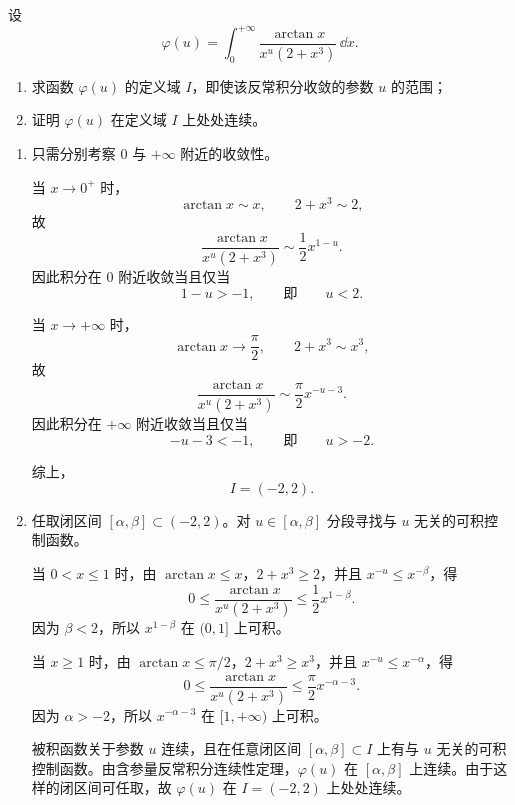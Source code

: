 \begin{question}[15分]
设
\[
  \varphi(u)=\int_0^{+\infty}\frac{\arctan x}{x^u(2+x^3)}\,\dd{x}.
\]
\begin{enumerate}
  \item 求函数 $\varphi(u)$ 的定义域 $I$，即使该反常积分收敛的参数 $u$ 的范围；
  \item 证明 $\varphi(u)$ 在定义域 $I$ 上处处连续。
\end{enumerate}
\begin{solution}
\begin{enumerate}
  \item 只需分别考察 $0$ 与 $+\infty$ 附近的收敛性。

  当 $x\to0^+$ 时，
  \[
    \arctan x\sim x,\qquad 2+x^3\sim2,
  \]
  故
  \[
    \frac{\arctan x}{x^u(2+x^3)}
    \sim \frac12 x^{1-u}.
  \]
  因此积分在 $0$ 附近收敛当且仅当
  \[
    1-u>-1,
    \qquad\text{即}\qquad u<2.
  \]

  当 $x\to+\infty$ 时，
  \[
    \arctan x\to\frac\pi2,\qquad 2+x^3\sim x^3,
  \]
  故
  \[
    \frac{\arctan x}{x^u(2+x^3)}
    \sim \frac\pi2 x^{-u-3}.
  \]
  因此积分在 $+\infty$ 附近收敛当且仅当
  \[
    -u-3<-1,
    \qquad\text{即}\qquad u>-2.
  \]

  综上，
  \[
    I=(-2,2).
  \]

  \item 任取闭区间 $[\alpha,\beta]\subset(-2,2)$。对 $u\in[\alpha,\beta]$ 分段寻找与 $u$ 无关的可积控制函数。

  当 $0<x\le1$ 时，由 $\arctan x\le x$，$2+x^3\ge2$，并且 $x^{-u}\le x^{-\beta}$，得
  \[
    0\le
    \frac{\arctan x}{x^u(2+x^3)}
    \le
    \frac12 x^{1-\beta}.
  \]
  因为 $\beta<2$，所以 $x^{1-\beta}$ 在 $(0,1]$ 上可积。

  当 $x\ge1$ 时，由 $\arctan x\le\pi/2$，$2+x^3\ge x^3$，并且 $x^{-u}\le x^{-\alpha}$，得
  \[
    0\le
    \frac{\arctan x}{x^u(2+x^3)}
    \le
    \frac{\pi}{2}x^{-\alpha-3}.
  \]
  因为 $\alpha>-2$，所以 $x^{-\alpha-3}$ 在 $[1,+\infty)$ 上可积。

  被积函数关于参数 $u$ 连续，且在任意闭区间 $[\alpha,\beta]\subset I$ 上有与 $u$ 无关的可积控制函数。由含参量反常积分连续性定理，$\varphi(u)$ 在 $[\alpha,\beta]$ 上连续。由于这样的闭区间可任取，故 $\varphi(u)$ 在 $I=(-2,2)$ 上处处连续。
\end{enumerate}
\end{solution}
\end{question}

